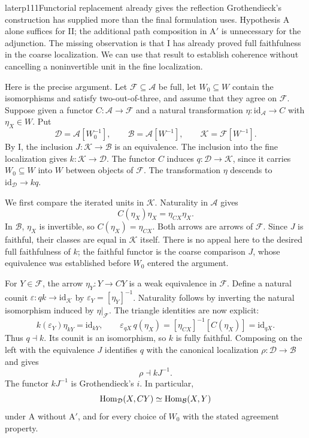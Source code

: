 \begin{dcomment}{later}{p111}{Functorial replacement already gives the reflection}
Grothendieck's construction has supplied more than the final formulation uses. Hypothesis A alone suffices for II; the additional path composition in A$'$ is unnecessary for the adjunction. The missing observation is that I has already proved full faithfulness in the coarse localization. We can use that result to establish coherence without cancelling a noninvertible unit in the fine localization.

Here is the precise argument. Let $\mathcal F\subseteq\mathcal A$ be full, let $W_0\subseteq W$ contain the isomorphisms and satisfy two-out-of-three, and assume that they agree on $\mathcal F$. Suppose given a functor $C:\mathcal A\to\mathcal F$ and a natural transformation $\eta:\mathrm{id}_{\mathcal A}\to C$ with $\eta_X\in W$. Put
\[
 \mathcal D=\mathcal A[W_0^{-1}],\qquad
 \mathcal B=\mathcal A[W^{-1}],\qquad
 \mathcal K=\mathcal F[W^{-1}].
\]
By I, the inclusion $J:\mathcal K\to\mathcal B$ is an equivalence. The inclusion into the fine localization gives $k:\mathcal K\to\mathcal D$. The functor $C$ induces $q:\mathcal D\to\mathcal K$, since it carries $W_0\subseteq W$ into $W$ between objects of $\mathcal F$. The transformation $\eta$ descends to $\mathrm{id}_{\mathcal D}\to kq$.

We first compare the iterated units in $\mathcal K$. Naturality in $\mathcal A$ gives
\[
 C(\eta_X)\eta_X=\eta_{CX}\eta_X.
\]
In $\mathcal B$, $\eta_X$ is invertible, so $C(\eta_X)=\eta_{CX}$. Both arrows are arrows of $\mathcal F$. Since $J$ is faithful, their classes are equal in $\mathcal K$ itself. There is no appeal here to the desired full faithfulness of $k$; the faithful functor is the coarse comparison $J$, whose equivalence was established before $W_0$ entered the argument.

For $Y\in\mathcal F$, the arrow $\eta_Y:Y\to CY$ is a weak equivalence in $\mathcal F$. Define a natural counit $\varepsilon:qk\to\mathrm{id}_{\mathcal K}$ by $\varepsilon_Y=[\eta_Y]^{-1}$. Naturality follows by inverting the natural isomorphism induced by $\eta|_{\mathcal F}$. The triangle identities are now explicit:
\[
 k(\varepsilon_Y)\eta_{kY}=\mathrm{id}_{kY},
 \qquad
 \varepsilon_{qX}\,q(\eta_X)
   =[\eta_{CX}]^{-1}[C(\eta_X)]
   =\mathrm{id}_{qX}.
\]
Thus $q\dashv k$. Its counit is an isomorphism, so $k$ is fully faithful. Composing on the left with the equivalence $J$ identifies $q$ with the canonical localization $\rho:\mathcal D\to\mathcal B$ and gives
\[
 \rho\dashv kJ^{-1}.
\]
The functor $kJ^{-1}$ is Grothendieck's $i$. In particular,
\[
 \operatorname{Hom}_{\mathcal D}(X,CY)
 \simeq \operatorname{Hom}_{\mathcal B}(X,Y)
\]
under A without A$'$, and for every choice of $W_0$ with the stated agreement property.


\end{dcomment}
